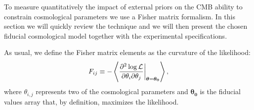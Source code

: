 \documentclass[aps,prd,reprint,superscriptaddress]{revtex4-1}
\newcommand\refeq[1]{Eq.~(\ref{eqn:#1})}
\begin{document}
To measure quantitatively the impact of external priors on the CMB ability to constrain cosmological parameters we use a Fisher matrix formalism. In this section we will quickly review the technique and we will then present the chosen fiducial cosmological model together with the experimental specifications.

As usual, we define the Fisher matrix elements as the curvature of the likelihood:
\begin{equation}
	\centering
		F_{ij} \equiv - \left\langle\frac{\partial^2 \log \mathcal{L}}{\partial \theta_i \partial \theta_j} \bigg|_{\boldsymbol{\theta} = \boldsymbol{\theta_0}}\right\rangle,
	\label{eqn:Fij_def}
\end{equation}
where $\theta_{i,j}$ represents two of the cosmological parameters and $\boldsymbol{\theta_0}$ is the fiducial values array that, by definition, maximizes the likelihood. 
\end{document}
